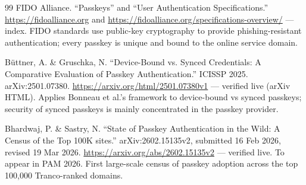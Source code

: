 \documentclass[11pt]{article}
\begin{document}
\begin{thebibliography}{99}
 FIDO Alliance. ``Passkeys'' and ``User
Authentication Specifications.''
\url{https://fidoalliance.org} and
\url{https://fidoalliance.org/specifications-overview/} --- index. FIDO
standards use public-key cryptography to provide phishing-resistant
authentication; every passkey is unique and bound to the online service
domain.

 B\"uttner, A. \& Gruschka, N.
``Device-Bound vs. Synced Credentials: A Comparative Evaluation of
Passkey Authentication.'' ICISSP 2025. arXiv:2501.07380.
\url{https://arxiv.org/html/2501.07380v1} --- verified live (arXiv
HTML). Applies Bonneau et al.'s framework to device-bound vs synced
passkeys; security of synced passkeys is mainly concentrated in the
passkey provider.

 Bhardwaj, P. \& Sastry, N. ``State of Passkey
Authentication in the Wild: A Census of the Top 100K sites.''
arXiv:2602.15135v2, submitted 16 Feb 2026, revised 19 Mar 2026.
\url{https://arxiv.org/abs/2602.15135v2} --- verified live. To appear
in PAM 2026. First large-scale census of passkey adoption across the
top 100,000 Tranco-ranked domains.

\end{thebibliography}
\end{document}
